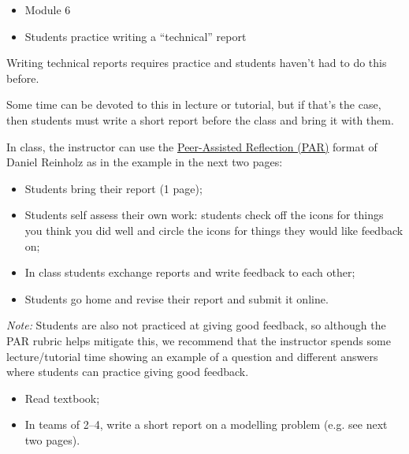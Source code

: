 \begin{lesson}

	\begin{itemize}
		\item Module 6
	\end{itemize}

	\begin{itemize}
		\item Students practice writing a ``technical'' report
	\end{itemize}
	


Writing technical reports requires practice and students haven't had to do this before.


Some time can be devoted to this in lecture or tutorial, but if that's the case, then students must write a short report before the class and bring it with them. 


\begin{annotation}
\begin{goals}
\end{goals}	
\end{annotation}
In class, the instructor can use the \href{https://link.springer.com/article/10.1007/s40753-015-0005-y}{Peer-Assisted Reflection (PAR)} format of Daniel Reinholz as in the example in the next two pages:
\begin{itemize}
	\item Students bring their report (1 page);
	\item Students self assess their own work: students check off the icons for things you think you did well and circle the icons for things they would like feedback on;
	\item In class students exchange reports and write feedback to each other;
	\item Students go home and revise their report and submit it online.
\end{itemize}

\emph{Note:} Students are also not practiced at giving good feedback, so although the PAR rubric helps mitigate this, we recommend that the instructor spends some lecture/tutorial time showing an example of a question and different answers where students can practice giving good feedback.


\begin{itemize}
	\item Read textbook;
	\item In teams of 2--4, write a short report on a modelling problem (e.g. see next two pages).
\end{itemize}



\end{lesson}

